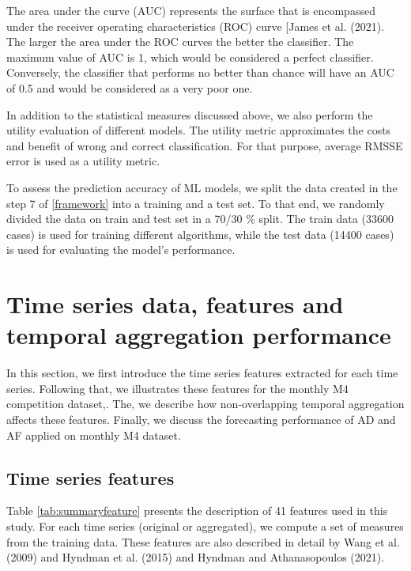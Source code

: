 \documentclass[]{elsarticle} %
\begin{document}
The area under the curve (AUC) represents the surface that is
encompassed under the receiver operating characteristics (ROC) curve
{[}James et al. (2021). The larger the area under the ROC curves the
better the classifier. The maximum value of AUC is 1, which would be
considered a perfect classifier. Conversely, the classifier that
performs no better than chance will have an AUC of 0.5 and would be
considered as a very poor one.

In addition to the statistical measures discussed above, we also perform
the utility evaluation of different models. The utility metric
approximates the costs and benefit of wrong and correct classification.
For that purpose, average RMSSE error is used as a utility metric.

To assess the prediction accuracy of ML models, we split the data
created in the step 7 of \ref{framework} into a training and a test set.
To that end, we randomly divided the data on train and test set in a
70/30 \% split. The train data (33600 cases) is used for training
different algorithms, while the test data (14400 cases) is used for
evaluating the model's performance.

\hypertarget{tsfeature}{%
\section{Time series data, features and temporal aggregation
performance}\label{tsfeature}}

In this section, we first introduce the time series features extracted
for each time series. Following that, we illustrates these features for
the monthly M4 competition dataset,. The, we describe how
non-overlapping temporal aggregation affects these features. Finally, we
discuss the forecasting performance of AD and AF applied on monthly M4
dataset.

\hypertarget{time-series-features}{%
\subsection{Time series features}\label{time-series-features}}

Table \ref{tab:summaryfeature} presents the description of 41 features
used in this study. For each time series (original or aggregated), we
compute a set of measures from the training data. These features are
also described in detail by Wang et al. (2009) and Hyndman et al. (2015)
and Hyndman and Athanasopoulos (2021).
\end{document}
